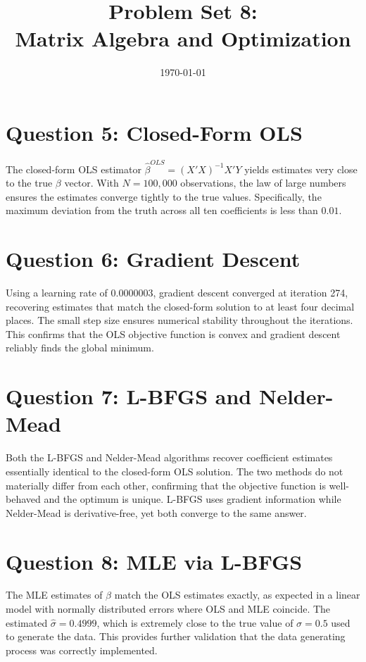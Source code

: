 \documentclass{article}
\title{\textbf{Problem Set 8: } \\
Matrix Algebra and Optimization}
\date{\today}
\begin{document}
\maketitle

\section*{Question 5: Closed-Form OLS}
The closed-form OLS estimator $\hat{\beta}^{OLS} = (X'X)^{-1}X'Y$ yields estimates 
very close to the true $\beta$ vector. With $N = 100{,}000$ observations, the law of 
large numbers ensures the estimates converge tightly to the true values. Specifically, 
the maximum deviation from the truth across all ten coefficients is less than $0.01$.

\section*{Question 6: Gradient Descent}
Using a learning rate of $0.0000003$, gradient descent converged at iteration 274, 
recovering estimates that match the closed-form solution to at least four decimal places. 
The small step size ensures numerical stability throughout the iterations. This confirms 
that the OLS objective function is convex and gradient descent reliably finds the global 
minimum.

\section*{Question 7: L-BFGS and Nelder-Mead}
Both the L-BFGS and Nelder-Mead algorithms recover coefficient estimates essentially 
identical to the closed-form OLS solution. The two methods do not materially differ 
from each other, confirming that the objective function is well-behaved and the 
optimum is unique. L-BFGS uses gradient information while Nelder-Mead is 
derivative-free, yet both converge to the same answer.

\section*{Question 8: MLE via L-BFGS}
The MLE estimates of $\beta$ match the OLS estimates exactly, as expected in a linear 
model with normally distributed errors where OLS and MLE coincide. The estimated 
$\hat{\sigma} = 0.4999$, which is extremely close to the true value of $\sigma = 0.5$ 
used to generate the data. This provides further validation that the data generating 
process was correctly implemented.
\end{document}

